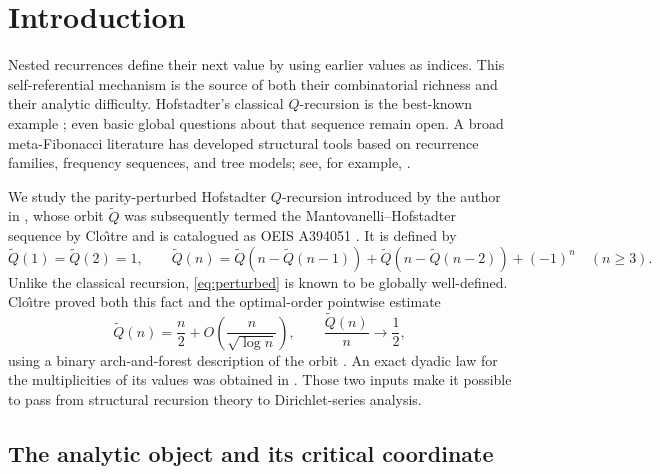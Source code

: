 \documentclass[11pt]{article}
\theoremstyle{definition}
\theoremstyle{remark}
\newcommand{\Qp}{\widetilde Q}
\begin{document}
\setcounter{tocdepth}{2}
\tableofcontents

\section{Introduction}
\label{sec:introduction}

Nested recurrences define their next value by using earlier values as
indices.  This self-referential mechanism is the source of both their
combinatorial richness and their analytic difficulty.  Hofstadter's
classical $Q$-recursion is the best-known example \cite{Hofstadter1979};
even basic global questions about that sequence remain open.  A broad
meta-Fibonacci literature has developed structural tools based on
recurrence families, frequency sequences, and tree models; see, for
example, \cite{CallaghanChewTanny2005,IsgurReissTanny2009}.

We study the parity-perturbed Hofstadter \(Q\)-recursion introduced by the
author in \cite{Mantovanelli2026Frequency}, whose orbit \(\Qp\) was
subsequently termed the Mantovanelli--Hofstadter sequence by Clo\^{\i}tre
\cite{Cloitre2026} and is catalogued as OEIS A394051
\cite{OEISA394051}.  It is defined by
\begin{equation}
 \Qp(1)=\Qp(2)=1,\qquad
 \Qp(n)=\Qp(n-\Qp(n-1))+\Qp(n-\Qp(n-2))+(-1)^n
 \quad(n\ge3).
 \label{eq:perturbed}
\end{equation}
Unlike the classical recursion, \eqref{eq:perturbed} is known to be
globally well-defined.  Clo\^{\i}tre proved both this fact and the
optimal-order pointwise estimate
\begin{equation}
 \Qp(n)=\frac n2+O\!\left(\frac{n}{\sqrt{\log n}}\right),
 \qquad \frac{\Qp(n)}n\longrightarrow\frac12,
 \label{eq:cloitre-asymptotic}
\end{equation}
using a binary arch-and-forest description of the orbit
\cite{Cloitre2026}.  An exact dyadic law for the multiplicities of its
values was obtained in \cite{Mantovanelli2026Frequency}.  Those two
inputs make it possible to pass from structural recursion theory to
Dirichlet-series analysis.

\subsection{The analytic object and its critical coordinate}
\end{document}
